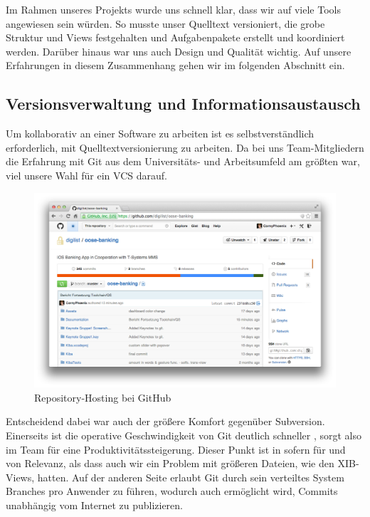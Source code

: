 Im Rahmen unseres Projekts wurde uns schnell klar, dass wir auf viele Tools angewiesen sein würden. So musste unser Quelltext versioniert, die grobe Struktur und Views festgehalten und Aufgabenpakete erstellt und koordiniert werden. Darüber hinaus war uns auch Design und Qualität wichtig. Auf unsere Erfahrungen in diesem Zusammenhang gehen wir im folgenden Abschnitt ein.

\subsection{Versionsverwaltung und Informationsaustausch}
	Um kollaborativ an einer Software zu arbeiten ist es selbstverständlich erforderlich, mit Quelltextversionierung zu arbeiten. Da bei uns Team-Mitgliedern die Erfahrung mit Git \cite{Git14} aus dem Universitäts- und Arbeitsumfeld am größten war, viel unsere Wahl für ein \acs{VCS} darauf.
	
\begin{figure}[h!]
	\centering
	\includegraphics[scale=.25]{Pictures/GitHubOverview}
	\caption{Repository-Hosting bei GitHub \label{fig:GitHubOverview}}
\end{figure}
	
	Entscheidend dabei war auch der größere Komfort gegenüber Subversion. Einerseits ist die operative Geschwindigkeit von Git deutlich schneller \cite{svngit}, sorgt also im Team für eine Produktivitätssteigerung. Dieser Punkt ist in sofern für und von Relevanz, als dass auch wir ein Problem mit größeren Dateien, wie den XIB-Views, hatten. Auf der anderen Seite erlaubt Git durch sein verteiltes System Branches pro Anwender zu führen, wodurch auch ermöglicht wird, Commits  unabhängig vom Internet zu publizieren. 
	
